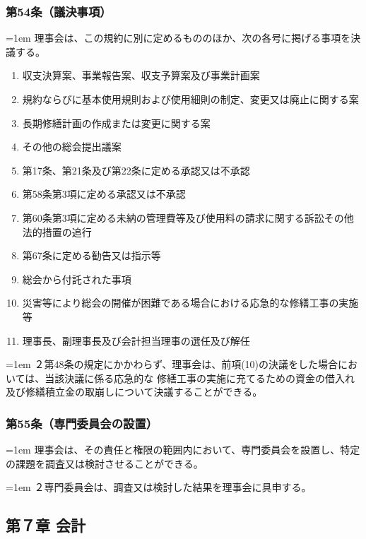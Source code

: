 \documentclass[
  luatex,
  paper=a4paper,
  fontsize=11pt,
  jafontsize=11pt,
  jlreq_notes,
]{jlreq}
\newcommand{\joumain}[1]{%
  \noindent\hangindent=1em\hangafter=1
  \hspace{1em}#1%
}
\newcommand{\kou}[2]{%
  \par\noindent\hangindent=1em\hangafter=1
  #1\hspace{1em}#2%
}
\begin{document}
  \subsubsection*{第54条（議決事項）}
  \joumain{理事会は、この規約に別に定めるもののほか、次の各号に掲げる事項を決議する。}
  \begin{enumerate}
    \item 収支決算案、事業報告案、収支予算案及び事業計画案
    \item 規約ならびに基本使用規則および使用細則の制定、変更又は廃止に関する案
    \item 長期修繕計画の作成または変更に関する案
    \item その他の総会提出議案
    \item 第17条、第21条及び第22条に定める承認又は不承認
    \item 第58条第3項に定める承認又は不承認
    \item 第60条第3項に定める未納の管理費等及び使用料の請求に関する訴訟その他法的措置の追行
    \item 第67条に定める勧告又は指示等
    \item 総会から付託された事項
    \item 災害等により総会の開催が困難である場合における応急的な修繕工事の実施等
    \item 理事長、副理事長及び会計担当理事の選任及び解任
  \end{enumerate}
  \kou{２}{第48条の規定にかかわらず、理事会は、前項(10)の決議をした場合においては、当該決議に係る応急的な
  修繕工事の実施に充てるための資金の借入れ及び修繕積立金の取崩しについて決議することができる。}

  \subsubsection*{第55条（専門委員会の設置）}
  \joumain{理事会は、その責任と権限の範囲内において、専門委員会を設置し、特定の課題を調査又は検討させることができる。}
  \kou{２}{専門委員会は、調査又は検討した結果を理事会に具申する。}
  
  \begin{center}
  \subsection*{第７章 会計}
  \end{center}
\end{document}
